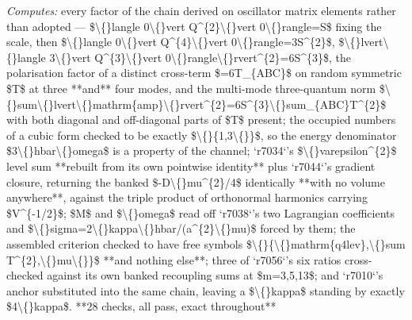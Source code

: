 \begin{description}
\emph{Computes:} every factor of the chain derived on oscillator matrix elements rather than adopted --- \$\textbackslash\{\}langle 0\textbackslash\{\}vert Q\textasciicircum{}\{2\}\textbackslash\{\}vert 0\textbackslash\{\}rangle=S\$ fixing the scale, then \$\textbackslash\{\}langle 0\textbackslash\{\}vert Q\textasciicircum{}\{4\}\textbackslash\{\}vert 0\textbackslash\{\}rangle=3S\textasciicircum{}\{2\}\$, \$\textbackslash\{\}lvert\textbackslash\{\}langle 3\textbackslash\{\}vert Q\textasciicircum{}\{3\}\textbackslash\{\}vert 0\textbackslash\{\}rangle\textbackslash\{\}rvert\textasciicircum{}\{2\}=6S\textasciicircum{}\{3\}\$, the polarisation factor of a distinct cross-term \$=6T\_\{ABC\}\$ on random symmetric \$T\$ at three **and** four modes, and the multi-mode three-quantum norm \$\textbackslash\{\}sum\textbackslash\{\}lvert\textbackslash\{\}mathrm\{amp\}\textbackslash\{\}rvert\textasciicircum{}\{2\}=6S\textasciicircum{}\{3\}\textbackslash\{\}sum\_\{ABC\}T\textasciicircum{}\{2\}\$ with both diagonal and off-diagonal parts of \$T\$ present; the occupied numbers of a cubic form checked to be exactly \$\textbackslash\{\}\{1,3\textbackslash\{\}\}\$, so the energy denominator \$3\textbackslash\{\}hbar\textbackslash\{\}omega\$ is a property of the channel; `r7034`'s \$\textbackslash\{\}varepsilon\textasciicircum{}\{2\}\$ level sum **rebuilt from its own pointwise identity** plus `r7044`'s gradient closure, returning the banked \$-D\textbackslash\{\}mu\textasciicircum{}\{2\}/4\$ identically **with no volume anywhere**, against the triple product of orthonormal harmonics carrying \$V\textasciicircum{}\{-1/2\}\$; \$M\$ and \$\textbackslash\{\}omega\$ read off `r7038`'s two Lagrangian coefficients and \$\textbackslash\{\}sigma=2\textbackslash\{\}kappa\textbackslash\{\}hbar/(a\textasciicircum{}\{2\}\textbackslash\{\}mu)\$ forced by them; the assembled criterion checked to have free symbols \$\textbackslash\{\}\{\textbackslash\{\}mathrm\{q4lev\},\textbackslash\{\}sum T\textasciicircum{}\{2\},\textbackslash\{\}mu\textbackslash\{\}\}\$ **and nothing else**; three of `r7056`'s six ratios cross-checked against its own banked recoupling sums at \$m=3,5,13\$; and `r7010`'s anchor substituted into the same chain, leaving a \$\textbackslash\{\}kappa\$ standing by exactly \$4\textbackslash\{\}kappa\$. **28 checks, all pass, exact throughout**

\end{description}
